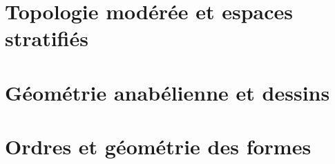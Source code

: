 \documentclass[11pt]{article}
\theoremstyle{plain}
\theoremstyle{definition}
\theoremstyle{plain}
\theoremstyle{definition}
\theoremstyle{remark}
\renewcommand{\_}{\bkunderscore\allowbreak}
\begin{document}








\part{Topologie modérée et espaces stratifiés}





\part{Géométrie anabélienne et dessins}




\part{Ordres et géométrie des formes}
\end{document}
